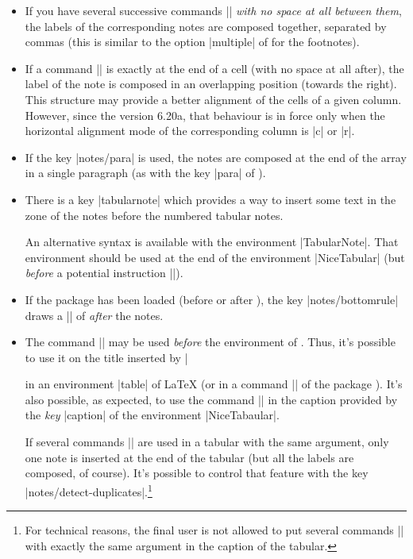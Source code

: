 \documentclass[dvipsnames]{article}%
\begin{document}
\bigskip
\begin{itemize}
\item If you have several successive commands || \emph{with no
space at all between them}, the labels of the corresponding notes are composed
together, separated by commas (this is similar to the option |multiple| of
 for the footnotes).

\item If a command || is exactly at the end of a cell (with
no space at all after), the label of the note is composed in an overlapping
position (towards the right). This structure may provide a better alignment of
the cells of a given column. However, since the version 6.20a, that behaviour is
in force only when the horizontal alignment mode of the corresponding column is
|c| or |r|.

\item If the key |notes/para| is used, the notes are composed at the end of
the array in a single paragraph (as with the key |para| of ).

\item {}
There is a key |tabularnote| which provides a way to insert some text in
the zone of the notes before the numbered tabular notes.

An alternative syntax is available with the environment |{TabularNote}|. That
environment should be used at the end of the environment |{NiceTabular}| (but
\emph{before} a potential instruction |\CodeAfter|).

\item If the package  has been loaded (before or after
), the key |notes/bottomrule| draws a |\bottomrule| of
 \emph{after} the notes. 

\item The command |\tabularnote| may be used \emph{before}
the environment of . Thus, it's possible to use it on the
title inserted by |\caption| in an environment |{table}| of LaTeX (or in a
command |\captionof| of the package ). It's also possible, as
expected, to use the command |\tabularnote| in the caption provided by the
\emph{key} |caption| of the environment |{NiceTabaular}|.

If several commands |\tabularnote| are used in a tabular with the same
argument, only one note is inserted at the end of the tabular (but all the
labels are composed, of course). It's possible to control that feature with
the key |notes/detect-duplicates|.\footnote{For technical reasons, the final
user is not allowed to put several commands |\tabularnote| with exactly the
same argument in the caption of the tabular.}


\end{itemize}
\end{document}
